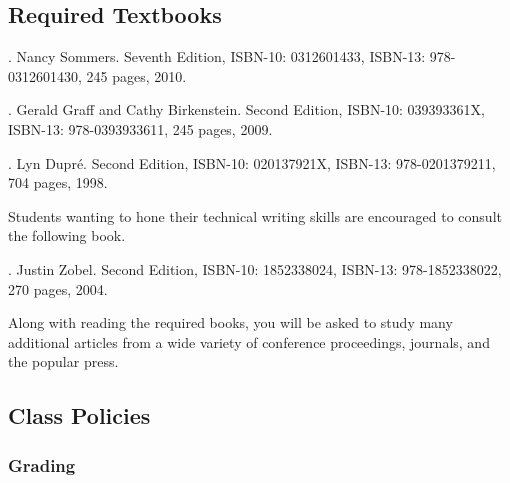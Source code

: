 \subsection*{Required Textbooks}


  . Nancy Sommers. Seventh Edition,  ISBN-10: 0312601433, ISBN-13: 978-0312601430,
  245 pages, 2010.


  . Gerald Graff and Cathy Birkenstein. Second Edition,
  ISBN-10: 039393361X, ISBN-13: 978-0393933611, 245 pages, 2009.


. Lyn Dupr\'e. Second Edition,  ISBN-10: 020137921X,
ISBN-13: 978-0201379211, 704 pages, 1998.

\noindent
Students wanting to hone their technical writing skills are encouraged to consult the following book.

.  Justin Zobel. Second Edition,  ISBN-10: 1852338024, ISBN-13:
978-1852338022, 270 pages, 2004.

\noindent
Along with reading the required books, you will be asked to study many additional articles from a wide variety of
conference proceedings, journals, and the popular press.

\subsection*{Class Policies}

\subsubsection*{Grading}


